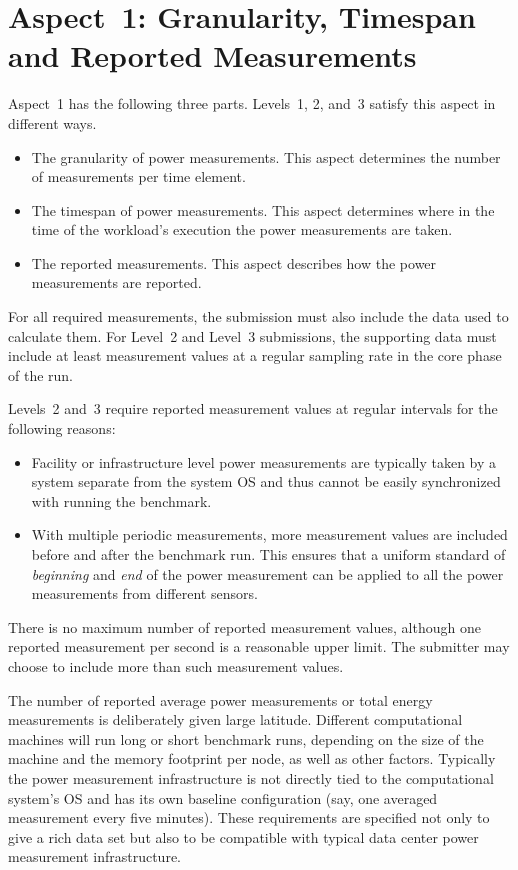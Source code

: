 \section{Aspect~1: Granularity, Timespan and Reported Measurements}
\label{sec:A1GTRM}

Aspect~1 has the following three parts.
Levels~1, 2, and~3 satisfy this aspect in different ways.

\begin{itemize}
\item
The granularity of power measurements.
This aspect determines the number of measurements per time element.
\item
The timespan of power measurements.
This aspect determines where in the time of the workload's execution the power measurements are taken.
\item
The reported measurements.
This aspect describes how the power measurements are reported.
\end{itemize}

For all required measurements, the submission must also include the data used to calculate them.
For Level~2 and Level~3 submissions, the supporting data must include at least \MinMeasurementsCorePhaseLTwoThree{} measurement values at a regular sampling rate in the core phase of the run.

Levels~2 and~3 require reported measurement values at regular intervals for the following reasons:

\begin{itemize}
\item
Facility or infrastructure level power measurements are typically taken by a system separate from the system OS and thus cannot be easily synchronized with running the benchmark.
\item
With multiple periodic measurements, more measurement values are included before and after the benchmark run.
This ensures that a uniform standard of \textit{beginning} and \textit{end} of the power measurement can be applied to all the power measurements from different sensors.
\end{itemize}

There is no maximum number of reported measurement values, although one reported measurement per second is a reasonable upper limit.
The submitter may choose to include more than \MinMeasurementsCorePhaseLTwoThree{} such measurement values.

The number of reported average power measurements or total energy measurements is deliberately given large latitude.
Different computational machines will run long or short benchmark runs, depending on the size of the machine and the memory footprint per node, as well as other factors.
Typically the power measurement infrastructure is not directly tied to the computational system's OS and has its own baseline configuration (say, one averaged measurement every five minutes).
These requirements are specified not only to give a rich data set but also to be compatible with typical data center power measurement infrastructure.

